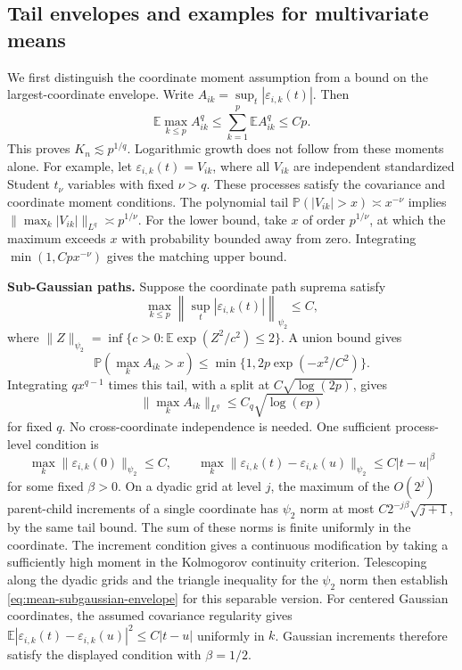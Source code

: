 \documentclass[12pt]{article}
\newcommand{\expect}{\mathbb{E}}
\newcommand{\prob}{\mathbb{P}}
\numberwithin{equation}{section}
\begin{document}
\subsection{Tail envelopes and examples for multivariate means}
\label{app:mean-heavy-tail-example}

We first distinguish the coordinate moment assumption from a bound
on the largest-coordinate envelope. Write
$A_{ik}=\sup_t|\varepsilon_{i,k}(t)|$. Then
\[
\expect\max_{k\le p}A_{ik}^q
\le\sum_{k=1}^p\expect A_{ik}^q\le Cp .
\]
This proves $K_n\lesssim p^{1/q}$. Logarithmic growth does not follow
from these moments alone. For example, let
$\varepsilon_{i,k}(t)=V_{ik}$, where all $V_{ik}$ are independent
standardized Student $t_\nu$ variables with fixed $\nu>q$.
These processes satisfy the covariance and coordinate moment conditions.
The polynomial tail $\prob(|V_{ik}|>x)\asymp x^{-\nu}$ implies
$\|\max_k|V_{ik}|\|_{L^q}\asymp p^{1/\nu}$.
For the lower bound, take $x$ of order $p^{1/\nu}$, at which the
maximum exceeds $x$ with probability bounded away from zero.
Integrating $\min(1,Cp x^{-\nu})$ gives the matching upper bound.

\noindent\textbf{Sub-Gaussian paths.}
Suppose the coordinate path suprema satisfy
\begin{equation}
\max_{k\le p}\left\|\sup_t|\varepsilon_{i,k}(t)|\right\|_{\psi_2}\le C,
\label{eq:mean-subgaussian-envelope}
\end{equation}
where $\|Z\|_{\psi_2}=\inf\{c>0:\expect\exp(Z^2/c^2)\le2\}$.
A union bound gives
\[
\prob(\max_k A_{ik}>x)\le
\min\{1,2p\exp(-x^2/C^2)\}.
\]
Integrating $q x^{q-1}$ times this tail, with a split at
$C\sqrt{\log(2p)}$, gives
\[
\|\max_k A_{ik}\|_{L^q}\le C_q\sqrt{\log(ep)}
\]
for fixed $q$.
No cross-coordinate independence is needed.
One sufficient process-level condition is
\[
\max_k\|\varepsilon_{i,k}(0)\|_{\psi_2}\le C,\qquad
\max_k\|\varepsilon_{i,k}(t)-\varepsilon_{i,k}(u)\|_{\psi_2}
\le C|t-u|^\beta
\]
for some fixed $\beta>0$. On a dyadic grid at level $j$, the maximum
of the $O(2^j)$ parent-child increments of a single coordinate has
$\psi_2$ norm at most $C2^{-j\beta}\sqrt{j+1}$, by the same tail
bound. The sum of these norms is finite uniformly in the coordinate.
The increment condition gives a continuous modification by taking
a sufficiently high moment in the Kolmogorov continuity criterion.
Telescoping along the dyadic grids and the triangle inequality for
the $\psi_2$ norm then establish
\eqref{eq:mean-subgaussian-envelope} for this separable version.
For centered Gaussian coordinates, the assumed covariance regularity
gives $\expect|\varepsilon_{i,k}(t)-\varepsilon_{i,k}(u)|^2
\le C|t-u|$ uniformly in $k$. Gaussian increments therefore satisfy
the displayed condition with $\beta=1/2$.
\end{document}
